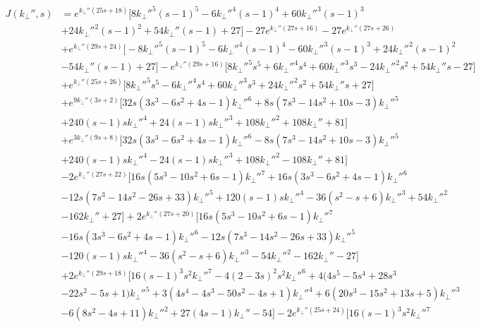 \documentclass{jfm}
\begin{document}
\begin{align}
J(k_\perp'',s)&=e^{k_\perp'' (25 s+18)} \big[8 k_\perp''^5 (s-1)^5-6 k_\perp''^4 (s-1)^4+60 k_\perp''^3 (s-1)^3\nonumber\\
&+24 k_\perp''^2 (s-1)^2+54 k_\perp'' (s-1)+27\big]-27 e^{k_\perp'' (27 s+16)}-27 e^{k_\perp'' (27 s+26)}\nonumber\\
&+e^{k_\perp'' (29 s+24)} \big[-8 k_\perp''^5 (s-1)^5-6 k_\perp''^4 (s-1)^4-60 k_\perp''^3 (s-1)^3+24 k_\perp''^2 (s-1)^2\nonumber\\
&-54 k_\perp'' (s-1)+27\big]-e^{k_\perp'' (29 s+16)}\big[8 k_\perp''^5 s^5+6 k_\perp''^4 s^4+60 k_\perp''^3 s^3-24 k_\perp''^2 s^2+54 k_\perp'' s-27\big]\nonumber\\
&+e^{k_\perp'' (25 s+26)} \big[8 k_\perp''^5 s^5-6 k_\perp''^4 s^4+60 k_\perp''^3 s^3+24 k_\perp''^2 s^2+54 k_\perp'' s+27\big]\nonumber\\
&+e^{9 k_\perp'' (3 s+2)} \big[32 s (3 s^3-6 s^2+4 s-1) k_\perp''^6+8 s (7 s^3-14 s^2+10 s-3) k_\perp''^5\nonumber\\
&+240 (s-1) s k_\perp''^4+24 (s-1) s k_\perp''^3+108 k_\perp''^2+108 k_\perp''+81\big]\nonumber\\
&+e^{3 k_\perp'' (9 s+8)} \big[32 s (3 s^3-6 s^2+4 s-1) k_\perp''^6-8 s (7 s^3-14 s^2+10 s-3) k_\perp''^5\nonumber\\
&+240 (s-1) s k_\perp''^4-24 (s-1) s k_\perp''^3+108 k_\perp''^2-108 k_\perp''+81\big]\nonumber\\
&-2 e^{k_\perp'' (27 s+22)} \big[16 s (5 s^3-10 s^2+6 s-1) k_\perp''^7+16 s (3 s^3-6 s^2+4 s-1) k_\perp''^6\nonumber\\
&-12 s (7 s^3-14 s^2-26 s+33) k_\perp''^5+120 (s-1) s k_\perp''^4-36 (s^2-s+6) k_\perp''^3+54 k_\perp''^2\nonumber\\
&-162 k_\perp''+27\big]+2 e^{k_\perp'' (27 s+20)} \big[16 s \left(5 s^3-10 s^2+6 s-1\right) k_\perp''^7\nonumber\\
&-16 s (3 s^3-6 s^2+4 s-1) k_\perp''^6-12 s (7 s^3-14 s^2-26 s+33) k_\perp''^5\nonumber\\
&-120 (s-1) s k_\perp''^4-36 (s^2-s+6) k_\perp''^3-54 k_\perp''^2-162 k_\perp''-27\big]\nonumber\\
&+2 e^{k_\perp'' (29 s+18)} \big[16 (s-1)^3 s^2 k_\perp''^7-4 (2-3 s)^2 s^2 k_\perp''^6+4 (4 s^5-5 s^4+28 s^3\nonumber\\
&-22 s^2-5 s+1) k_\perp''^5+3 (4 s^4-4 s^3-50 s^2-4 s+1) k_\perp''^4+6 (20 s^3-15 s^2+13 s+5) k_\perp''^3\nonumber\\
&-6 (8 s^2-4 s+11) k_\perp''^2+27 (4 s-1) k_\perp''-54\big]-2 e^{k_\perp'' (25 s+24)} \big[16 (s-1)^3 s^2 k_\perp''^7\nonumber\\

\end{align}
\end{document}

